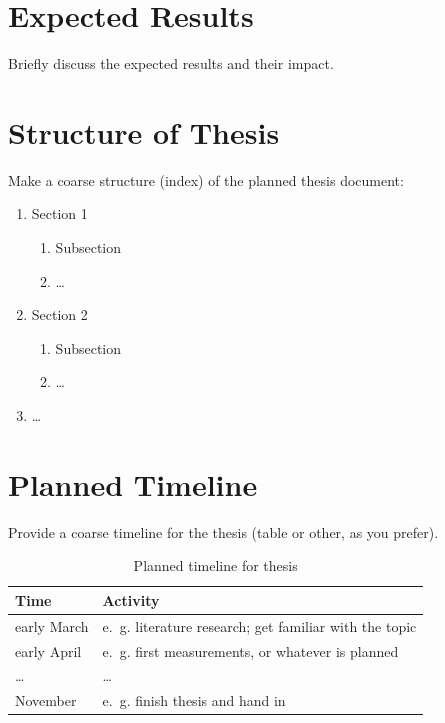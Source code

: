\documentclass[a4paper,headsepline,oneside,11pt]{scrartcl}
\begin{document}
\section{Expected Results}
\label{sec:results}
%
Briefly discuss the expected results and their impact.
%
\section{Structure of Thesis}
\label{sec:structure}
%
Make a coarse structure (index) of the planned thesis document:
% 
\begin{enumerate}
\item Section 1
  \begin{enumerate}
  \item Subsection
  \item \dots
  \end{enumerate}
\item Section 2
  \begin{enumerate}
  \item Subsection
  \item \dots
  \end{enumerate}
\item \dots
\end{enumerate}
% 
\section{Planned Timeline}
\label{sec:timeline}
%
Provide a coarse timeline for the thesis (table or other, as you prefer).
\begin{table}[htb!]
  \centering
  \caption{Planned timeline for thesis}
  \label{tab:timeline}
  \begin{tabularx}{\linewidth}{l|l}
    \toprule%
    \textbf{Time} & \textbf{Activity}\\
    \midrule
    early March & e.~g. literature research; get familiar with the topic\\
    \midrule
    early April & e.~g. first measurements, or whatever is planned\\
    \midrule
    \dots & \dots\\
    \midrule
    November & e.~g. finish thesis and hand in\\
   \bottomrule
  \end{tabularx}
\end{table}
\FloatBarrier
\printbibliography[heading=bibintoc]

\end{document}
